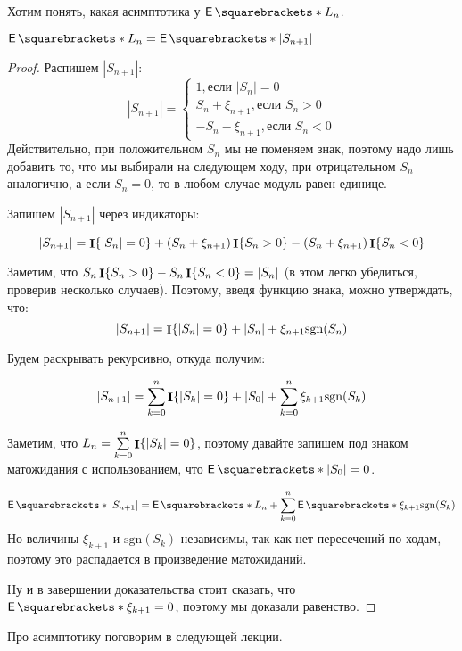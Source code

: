 Хотим понять, какая асимптотика у $\E{L_n}$.

\begin{lemma}
  $\E{L_n} = \E{|S_{n + 1}|}$
\end{lemma}

\begin{proof}
  Распишем $|S_{n+1}|$:
  \[
  |S_{n + 1}| =
  \begin{cases}
    1, \text{если $|S_n| = 0$}\\
    S_n + \xi_{n + 1}, \text{если $S_n > 0$}\\
    -S_n - \xi_{n + 1}, \text{если $S_n < 0$}
  \end{cases}
  \]
  Действительно, при положительном $S_n$ мы не поменяем знак, поэтому
  надо лишь добавить то, что мы выбирали на следующем ходу, при отрицательном
  $S_n$ аналогично, а если $S_n = 0$, то в любом случае модуль равен единице.

  Запишем $|S_{n + 1}|$ через индикаторы:

  \[
    |S_{n + 1}| = \mathop{\mathbf{I}}\{|S_n| = 0\} + (S_n + \xi_{n + 1})\mathop{\mathbf{I}}\{S_n > 0\} -(S_n + \xi_{n + 1})\mathop{\mathbf{I}}\{S_n < 0\}
  \]

  Заметим, что $S_n \mathop{\mathbf{I}}\{S_n > 0\} - S_n \mathop{\mathbf{I}}\{S_n < 0\} = |S_n|$ (в этом легко
  убедиться, проверив несколько случаев). Поэтому, введя функцию знака, можно
  утверждать, что:
  \[
   |S_{n + 1}| = \mathop{\mathbf{I}}\{|S_n| = 0\} + |S_n| + \xi_{n + 1}\mathrm{sgn}(S_n)
  \]

  Будем раскрывать рекурсивно, откуда получим:

  \[
    |S_{n + 1}| = \sum\limits_{k = 0}^{n} \mathop{\mathbf{I}}\{|S_k| = 0\} + |S_0| +
    \sum\limits_{k = 0}^{n} \xi_{k + 1}\mathrm{sgn}(S_{k})
  \]

  Заметим, что $L_n = \sum\limits_{k = 0}^{n} \mathop{\mathbf{I}}\{|S_k| = 0\}$, поэтому давайте
  запишем под знаком матожидания с использованием, что $\E{|S_0|} = 0$.

  \[
    \E{|S_{n + 1}|} = \E{L_n} + \sum\limits_{k = 0}^{n} \E{\xi_{k + 1}\mathrm{sgn}(S_{k})}
  \]
  Но величины $\xi_{k + 1}$ и $\mathrm{sgn}(S_{k})$ независимы, так как нет
  пересечений по ходам, поэтому это распадается в произведение матожиданий.

  Ну и в завершении доказательства стоит сказать, что $\E{\xi_{k + 1}} = 0$, поэтому
  мы доказали равенство.
\end{proof}

Про асимптотику поговорим в следующей лекции.
